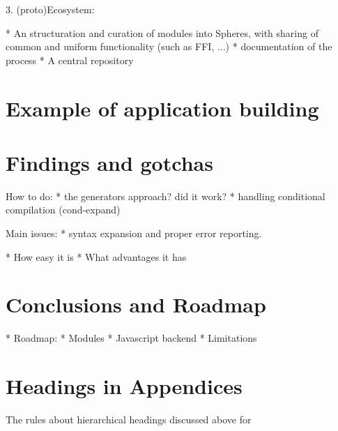 \documentclass{acm_proc_article-sp}
\begin{document}
3. (proto)Ecosystem:

* An structuration and curation of modules into Spheres, with sharing of common and uniform functionality (such as FFI, ...)
* documentation of the process
* A central repository




\section{Example of application building}




\section{Findings and gotchas}



How to do:
* the generators approach? did it work?
* handling conditional compilation (cond-expand)


Main issues:
* syntax expansion and proper error reporting.




* How easy it is
* What advantages it has


\section{Conclusions and Roadmap}


* Roadmap:
  * Modules
  * Javascript backend
* Limitations


\appendix
\section{Headings in Appendices}
The rules about hierarchical headings discussed above for
\balancecolumns
\end{document}
